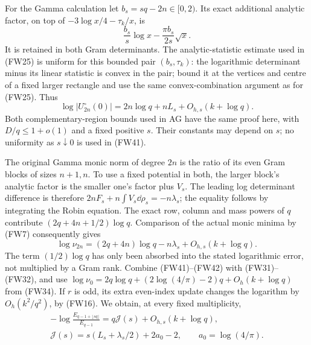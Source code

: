 \documentclass[11pt]{article}
\begin{document}
For the Gamma calculation let $b_s=sq-2n\in[0,2)$. Its exact additional
analytic factor, on top of $-3\log x/4-\tau_k/x$, is
\[
 \frac{b_s}{s}\log x-\frac{\pi b_s}{2s}\sqrt x.
\]
It is retained in both Gram determinants. The analytic-statistic estimate
used in (FW25) is uniform for this bounded pair $(b_s,\tau_k)$: the
logarithmic determinant minus its linear statistic is convex in the pair;
bound it at the vertices and centre of a fixed larger rectangle and use
the same convex-combination argument as for (FW25). Thus
\begin{equation}\tag{FW41}
 \log|U_{2n}^\circ(0)|=2n\log q+nL_s+O_{h,s}(k+\log q).
\end{equation}
Both complementary-region bounds used in AG have the same proof here,
with $D/q\le1+o(1)$ and a fixed positive $s$. Their constants may depend
on $s$; no uniformity as $s\downarrow0$ is used in (FW41).

The original Gamma monic norm of degree $2n$ is the ratio of its even
Gram blocks of sizes $n+1,n$. To use a fixed potential in both, the
larger block's analytic factor is the smaller one's factor plus $V_s$.
The leading log determinant difference is therefore
$2nF_s+n\int V_s\dd\rho_s=-n\lambda_s$; the equality follows by
integrating the Robin equation. The exact row, column and mass powers
of $q$ contribute $(2q+4n+1/2)\log q$.
Comparison of the actual monic minima by (FW7) consequently gives
\begin{equation}\tag{FW42}
 \log\nu_{2n}=(2q+4n)\log q-n\lambda_s+O_{h,s}(k+\log q).
\end{equation}
The term $(1/2)\log q$ has only been absorbed into the stated logarithmic
error, not multiplied by a Gram rank. Combine (FW41)--(FW42) with
(FW31)--(FW32), and use
$\log\nu_0=2q\log q+(2\log(4/\pi)-2)q+O_h(k+\log q)$ from (FW34).
If $r$ is odd, its extra even-index update changes the logarithm by
$O_h(k^2/q^2)$, by (FW16). We obtain, at every fixed multiplicity,
\begin{equation}\tag{FW43}
 \boxed{\begin{gathered}
 -\log\frac{E_{q-1+\lfloor sq\rfloor}}{E_{q-1}}
 =q\mathcal J(s)+O_{h,s}(k+\log q),\\
 \mathcal J(s)=s(L_s+\lambda_s/2)+2a_0-2,\qquad a_0=\log(4/\pi).
 \end{gathered}}
\end{equation}
\end{document}
